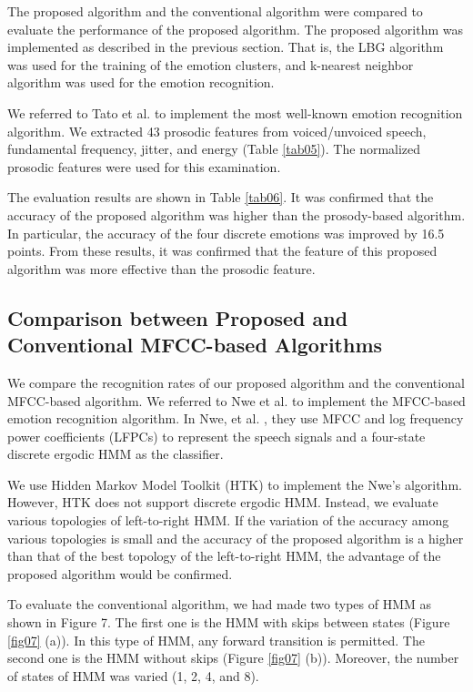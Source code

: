 \documentclass[english]{jnlp_1.3e}
\begin{document}
The proposed algorithm and the conventional algorithm were compared to evaluate the performance of the proposed algorithm. The proposed algorithm was implemented as described in the previous section. That is, the LBG algorithm was used for the training of the emotion clusters, and k-nearest neighbor algorithm was used for the emotion recognition.

We referred to Tato et al. \cite{Tato2002} to implement the most well-known emotion recognition algorithm. We extracted 43 prosodic features from voiced/unvoiced speech, fundamental frequency, jitter, and energy (Table \ref{tab05}). The normalized prosodic features were used for this examination.


The evaluation results are shown in Table \ref{tab06}. It was confirmed that the accuracy of the proposed algorithm was higher than the prosody-based algorithm. In particular, the accuracy of the four discrete emotions was improved by 16.5 points. From these results, it was confirmed that the feature of this proposed algorithm was more effective than the prosodic feature.


\subsection{Comparison between Proposed and Conventional MFCC-based Algorithms}

We compare the recognition rates of our proposed algorithm and the conventional MFCC-based algorithm. We referred to Nwe et al. \cite{Nwe2003} to implement the MFCC-based emotion recognition algorithm. In Nwe, et al. \cite{Nwe2003}, they use MFCC and log frequency power coefficients (LFPCs) to represent the speech signals and a four-state discrete ergodic HMM as the classifier.

We use Hidden Markov Model Toolkit (HTK) \cite{Young2002} to implement the Nwe's algorithm. However, HTK does not support discrete ergodic HMM. Instead, we evaluate various topologies of left-to-right HMM. If the variation of the accuracy among various topologies is small and the accuracy of the proposed algorithm is a higher than that of the best topology of the left-to-right HMM, the advantage of the proposed algorithm would be confirmed.

To evaluate the conventional algorithm, we had made two types of HMM as shown in Figure 7. The first one is the HMM with skips between states (Figure \ref{fig07} (a)). In this type of HMM, any forward transition is permitted. The second one is the HMM without skips (Figure \ref{fig07} (b)). Moreover, the number of states of HMM was varied (1, 2, 4, and 8). 
\end{document}
